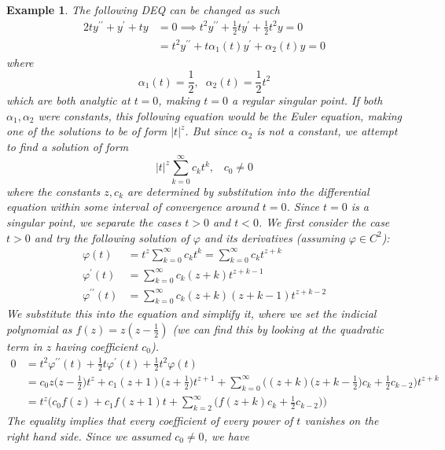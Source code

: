 \documentclass{article}
\newtheorem{example}{Example}[section]
\theoremstyle{remark}
\theoremstyle{definition}
\begin{document}
\begin{example}
The following DEQ can be changed as such
\begin{align*}
    2ty^{\prime\prime} + y^\prime + ty & = 0 \implies t^2 y^{\prime\prime} + \frac{1}{2} ty^\prime + \frac{1}{2} t^2 y = 0 \\
    & = t^2 y^{\prime\prime} + t \alpha_1 (t) y^\prime + \alpha_2 (t) y = 0
\end{align*}
where
\[\alpha_1 (t) = \frac{1}{2}, \;\; \alpha_2 (t) = \frac{1}{2} t^2\]
which are both analytic at $t = 0$, making $t = 0$ a regular singular point. If both $\alpha_1, \alpha_2$ were constants, this following equation would be the Euler equation, making one of the solutions to be of form $|t|^z$. But since $\alpha_2$ is not a constant, we attempt to find a solution of form 
\[|t|^z \sum_{k=0}^\infty c_k t^k, \;\;\; c_0 \neq 0\]
where the constants $z, c_k$ are determined by substitution into the differential equation within some interval of convergence around $t = 0$. Since $t = 0$ is a singular point, we separate the cases $t>0$ and $t<0$. We first consider the case $t>0$ and try the following solution of $\varphi$ and its derivatives (assuming $\varphi \in C^2$): 
\begin{align*}
    \varphi (t) & = t^z \sum_{k=0}^\infty c_k t^k = \sum_{k=0}^\infty c_k t^{z+k} \\
    \varphi^\prime (t) & = \sum_{k=0}^\infty c_k (z+k) t^{z+k-1} \\
    \varphi^{\prime\prime} (t) & = \sum_{k=0}^\infty c_k (z+k)(z+k-1) t^{z+k-2} 
\end{align*}
We substitute this into the equation and simplify it, where we set the indicial polynomial as $f(z) = z (z - \frac{1}{2})$ (we can find this by looking at the quadratic term in $z$ having coefficient $c_0$). 
\begin{align*}
    0 & = t^2 \varphi^{\prime\prime} (t) + \frac{1}{2} t \varphi^\prime (t) + \frac{1}{2} t^2 \varphi (t) \\
    & = c_0 z \bigg(z - \frac{1}{2}\bigg) t^z + c_1 (z+1) \bigg( z+\frac{1}{2}\bigg) t^{z+1} + \sum_{k=0}^\infty \bigg( (z+k) \Big(z+k-\frac{1}{2} \Big) c_k + \frac{1}{2} c_{k-2}\bigg) t^{z+k}\\
    & = t^z \Bigg( c_0 f(z) + c_1 f(z+1) t + \sum_{k=2}^\infty \bigg( f(z+k) c_k + \frac{1}{2} c_{k-2} \bigg)\Bigg) 
\end{align*}
The equality implies that every coefficient of every power of $t$ vanishes on the right hand side. Since we assumed $c_0 \neq 0$, we have

\end{example}
\end{document}
